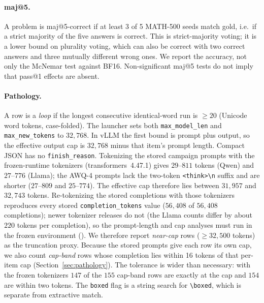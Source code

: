 \documentclass[11pt,a4paper]{article}
\begin{document}
\paragraph{maj@5.}
A problem is maj@5-correct if at least 3 of 5 MATH-500 seeds match gold, i.e.\ if a strict majority of the five answers is correct. This is strict-majority voting; it is a lower bound on plurality voting, which can also be correct with two correct answers and three mutually different wrong ones. We report the accuracy, not only the McNemar test against BF16. Non-significant maj@5 tests do not imply that pass@1 effects are absent.

\paragraph{Pathology.}
A row is a \emph{loop} if the longest consecutive identical-word run is $\ge 20$ (Unicode word tokens, case-folded). The launcher sets both \texttt{max\_model\_len} and \texttt{max\_new\_tokens} to $32{,}768$. In vLLM the first bound is prompt plus output, so the effective output cap is $32{,}768$ minus that item's prompt length. Compact JSON has no \texttt{finish\_reason}. Tokenizing the stored campaign prompts with the frozen-runtime tokenizers (transformers~4.47.1) gives $29$--$811$ tokens (Qwen) and $27$--$776$ (Llama); the AWQ-4 prompts lack the two-token \texttt{<think>\textbackslash n} suffix and are shorter ($27$--$809$ and $25$--$774$). The effective cap therefore lies between $31{,}957$ and $32{,}743$ tokens. Re-tokenizing the stored completions with those tokenizers reproduces every stored \texttt{completion\_tokens} value ($56{,}408$ of $56{,}408$ completions); newer tokenizer releases do not (the Llama counts differ by about $220$ tokens per completion), so the prompt-length and cap analyses must run in the frozen environment (). We therefore report \emph{near-cap} rows ($\ge 32{,}500$ tokens) as the truncation proxy. Because the stored prompts give each row its own cap, we also count \emph{cap-band} rows whose completion lies within 16 tokens of that per-item cap (Section~\ref{sec:pathology}). The tolerance is wider than necessary: with the frozen tokenizers $147$ of the $155$ cap-band rows are exactly at the cap and $154$ are within two tokens. The \texttt{boxed} flag is a string search for \texttt{\textbackslash boxed}, which is separate from extractive match.
\end{document}
